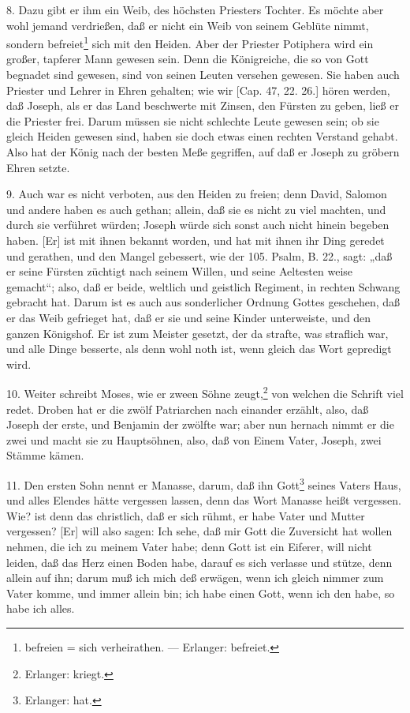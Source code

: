 8. Dazu gibt er ihm ein Weib, des höchsten Priesters Tochter. Es möchte aber wohl jemand verdrießen, daß er nicht ein Weib von seinem Geblüte nimmt, sondern befreiet\footnote{befreien = sich verheirathen. — Erlanger: befreiet.} sich mit den Heiden. Aber der Priester Potiphera wird ein großer, tapferer Mann gewesen sein. Denn die Königreiche, die so von Gott begnadet sind gewesen, sind von seinen Leuten versehen gewesen. Sie haben auch Priester und Lehrer in Ehren gehalten; wie wir [Cap. 47, 22. 26.] hören werden, daß Joseph, als er das Land beschwerte mit Zinsen, den Fürsten zu geben, ließ er die Priester frei. Darum müssen sie nicht schlechte Leute gewesen sein; ob sie gleich Heiden gewesen sind, haben sie doch etwas einen rechten Verstand gehabt. Also hat der König nach der besten Meße gegriffen, auf daß er Joseph zu gröbern Ehren setzte.

9. Auch war es nicht verboten, aus den Heiden zu freien; denn David, Salomon und andere haben es auch gethan; allein, daß sie es nicht zu viel machten, und durch sie verführet würden; Joseph würde sich sonst auch nicht hinein begeben haben. [Er] ist mit ihnen bekannt worden, und hat mit ihnen ihr Ding geredet und gerathen, und den Mangel gebessert, wie der 105. Psalm, B. 22., sagt: „daß er seine Fürsten züchtigt nach seinem Willen, und seine Aeltesten weise gemacht“; also, daß er beide, weltlich
und geistlich Regiment, in rechten Schwang gebracht hat. Darum ist es auch aus sonderlicher Ordnung Gottes geschehen, daß er das Weib gefrieget hat, daß er sie und seine Kinder unterweiste, und den ganzen Königshof. Er ist zum Meister gesetzt, der da strafte, was straflich war, und alle Dinge besserte, als denn wohl noth ist, wenn gleich das Wort gepredigt wird.

10. Weiter schreibt Moses, wie er zween Söhne zeugt,\footnote{Erlanger: kriegt.} von welchen die Schrift viel redet. Droben hat er die zwölf Patriarchen nach einander erzählt, also, daß Joseph der erste, und Benjamin der zwölfte war; aber nun hernach nimmt er die zwei und macht sie zu Hauptsöhnen, also, daß von Einem Vater, Joseph, zwei Stämme kämen.

11. Den ersten Sohn nennt er Manasse, darum, daß ihn Gott\footnote{Erlanger: hat.} seines Vaters Haus, und alles Elendes hätte vergessen lassen, denn das Wort Manasse heißt vergessen. Wie? ist denn das christlich, daß er sich rühmt, er habe Vater und Mutter vergessen? [Er] will also sagen: Ich sehe, daß mir Gott die Zuversicht hat wollen nehmen, die ich zu meinem Vater habe; denn Gott ist ein Eiferer, will nicht leiden, daß das Herz einen Boden habe, darauf es sich verlasse und stütze, denn allein auf ihn; darum muß ich mich deß erwägen, wenn ich gleich nimmer zum Vater komme, und immer allein bin; ich habe einen Gott, wenn ich den habe, so habe ich alles.

